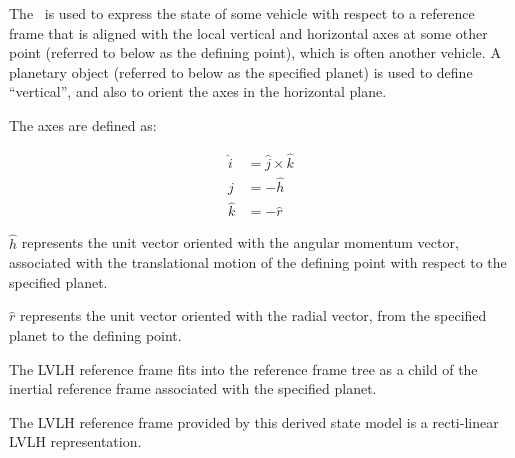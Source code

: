 %
%
% 
%


The \LVLHDesc\ is used to express the state of some vehicle with respect to a reference frame that is aligned with the local vertical and horizontal axes at some other point (referred to below as the defining point), which is often another vehicle.  A planetary object (referred to below as the specified planet) is used to define ``vertical'', and also to orient the axes in the horizontal plane.

The axes are defined as:

\begin{align*}
 \hat i &= \hat j \times \hat k \\
 \hat j &= - \hat h \\
 \hat k &= - \hat r
\end{align*}

$\hat h$ represents the unit vector oriented with the angular momentum vector, associated with the translational motion of the defining point with respect to the specified planet.

$\hat r$ represents the unit vector oriented with the radial vector, from the specified planet to the defining point.

The LVLH reference frame fits into the reference frame tree as a child of the inertial reference frame associated with the specified planet.

The LVLH reference frame provided by this derived state model is a recti-linear LVLH representation.
